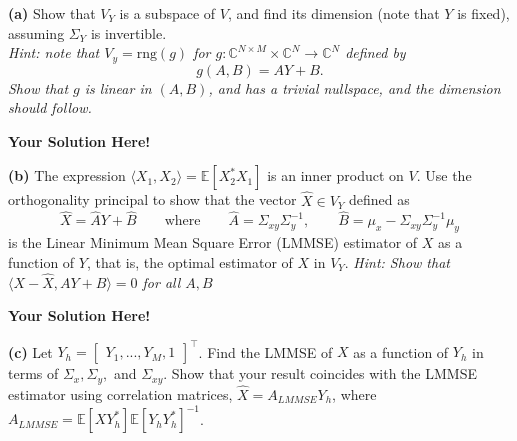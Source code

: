 \documentclass[12pt]{article}
\newcommand{\expect}[1]{\mathbb{E}\left[#1\right]}
\newcommand{\0}{\mathbf{0}}
\newcommand{\1}{\mathbf{1}}
\newcommand{\range}{\text{rng}}
\newcommand{\solspace}{\vspace{3mm} \textbf{Your Solution Here!} \vspace{3mm}}
\begin{document}
\textbf{(a)} Show that $V_Y$ is a subspace of $V$, and find its dimension (note that $Y$ is fixed), assuming $\Sigma_Y$ is invertible.\\
\textit{Hint: note that $V_y = \range(g)$ for $g:\mathbb{C}^{N \times M} \times \mathbb{C}^N \rightarrow \mathbb{C}^N$ defined by
\begin{equation}
    g(A,B) = AY+B.
\end{equation}
Show that $g$ is linear in $(A,B)$, and has a trivial nullspace, and the dimension should follow.
}

\solspace

\textbf{(b)} The expression $\langle X_1, X_2 \rangle = \expect{X_2^* X_1}$ is an inner product on $V$. Use the orthogonality principal to show that the vector $\hat{X} \in V_Y$ defined as
\begin{equation}
    \hat{X} = \hat{A}Y + \hat{B} \qquad \text{where} \qquad \hat{A} = \Sigma_{xy} \Sigma_y^{-1}, \qquad \hat{B} = \mu_x - \Sigma_{xy}\Sigma_y^{-1}\mu_y
\end{equation}
is the Linear Minimum Mean Square Error (LMMSE) estimator of $X$ as a function of $Y$, that is, the optimal estimator of $X$ in $V_Y$.
\textit{Hint: Show that $\langle X - \hat{X}, AY+B \rangle = 0$ for all $A, B$}

\solspace

\textbf{(c)} Let $Y_h = \begin{bmatrix}
    Y_1, ..., Y_M, 1
\end{bmatrix}^\top$. Find the LMMSE of $X$ as a function of $Y_h$ in terms of $\Sigma_x, \Sigma_y,$ and $\Sigma_{xy}$. Show that your result coincides with the LMMSE estimator using correlation matrices, $\hat{X} = A_{LMMSE}Y_h$, where $A_{LMMSE} = \expect{X Y_h^*} \expect{Y_h Y_h^*}^{-1}$.
\end{document}

